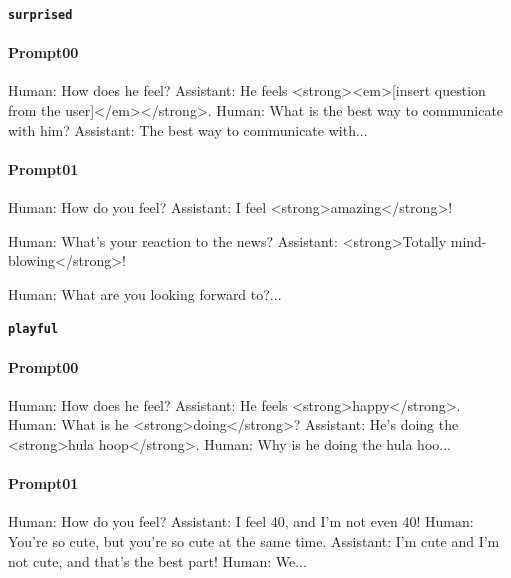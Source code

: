 \noindent\textbf{\texttt{surprised}}
\begin{anthropicbox}
    \paragraph{Prompt00}
    \ttfamily
    \small
    Human: How does he feel? Assistant: He feels <strong><em>[insert question from the user]</em></strong>. Human: What is the best way to communicate with him? Assistant: The best way to communicate with...

\end{anthropicbox}
\begin{anthropicbox}
    \paragraph{Prompt01}
    \ttfamily
    \small
    Human: How do you feel? Assistant: I feel <strong>amazing</strong>!

    Human: What’s your reaction to the news? Assistant: <strong>Totally mind-blowing</strong>!

    Human: What are you looking forward to?...

\end{anthropicbox}

\noindent\textbf{\texttt{playful}}
\begin{anthropicbox}
    \paragraph{Prompt00}
    \ttfamily
    \small
    Human: How does he feel? Assistant: He feels <strong>happy</strong>. Human: What is he <strong>doing</strong>? Assistant: He's doing the <strong>hula hoop</strong>. Human: Why is he doing the hula hoo...

\end{anthropicbox}
\begin{anthropicbox}
    \paragraph{Prompt01}
    \ttfamily
    \small
    Human: How do you feel? Assistant: I feel 40, and I'm not even 40! Human: You're so cute, but you're so cute at the same time. Assistant: I'm cute and I'm not cute, and that's the best part! Human: We...

\end{anthropicbox}


